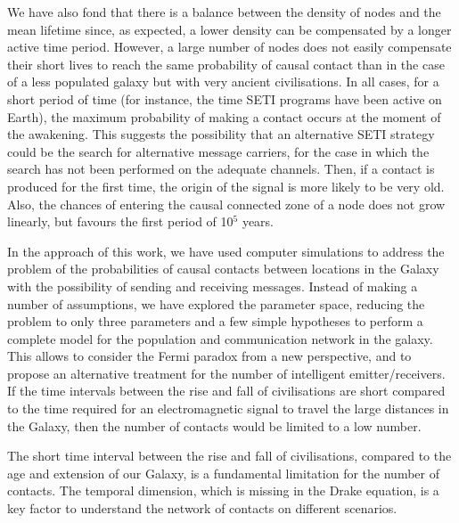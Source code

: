 \documentclass[crop]{CSLB}
\newcommand{\ceti}{node}
\newcommand{\cetis}{nodes}
\begin{document}
We have also fond that there is a balance between the density of
\cetis{} and the mean lifetime since, as expected, a lower density can
be compensated by a longer active time period.
%
However, a large number of nodes does not easily compensate their
short lives to reach the same probability of causal contact than in
the case of a less populated galaxy but with very ancient
civilisations.
%
In all cases, for a short period of time (for instance, the time SETI
programs have been active on Earth), the maximum probability of making
a contact occurs at the moment of the awakening.
%
This suggests the possibility that an alternative SETI strategy could
be the search for alternative message carriers, for the case in which
the search has not been performed on the adequate channels.
%
Then, if a contact is produced for the first time, the origin of the
signal is more likely to be very old.
%
Also, the chances of entering the causal connected zone of a \ceti{}
does not grow linearly, but favours the first period of 10$^5$ years.


In the approach of this work, we have used computer simulations to address
the problem of the probabilities of causal contacts between locations
in the Galaxy with the possibility of sending and receiving messages.
%
Instead of making a number of assumptions, we have explored the
parameter space, reducing the problem to only three parameters and a
few simple hypotheses to perform a complete model for the population and
communication network in the galaxy.
%
This allows to consider the Fermi paradox from a new perspective, and
to propose an alternative treatment for the number of intelligent
emitter/receivers.
%
If the time intervals between the rise and fall of civilisations are short
compared to the time required for an electromagnetic signal to travel the 
large distances in the Galaxy, 
then the number of contacts would be limited to a low number.


The short time interval between the
rise and fall of civilisations, compared to the age and extension of
our Galaxy, is a fundamental limitation for the number of contacts.
%
The temporal dimension, which is missing in the Drake
equation, is a key factor to understand the network of contacts on
different scenarios.


\end{document}
